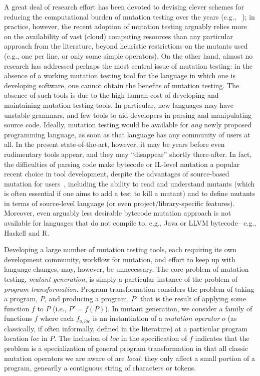 \documentclass[acmsmall,screen,review,anonymous]{acmart}
\begin{document}
A great deal of research effort has been devoted to devising clever
schemes for reducing the computational burden of mutation testing over
the years (e.g., ~\cite{offutt2001mutation,
  untch1993mutation,KaufmanFAKAJ2022}); in practice, however, the recent adoption of mutation
testing arguably relies more on the availability of vast (cloud) computing
resources than any particular approach from the literature, beyond
heuristic restrictions on the mutants used (e.g., one per line, or
only some simple operators).   On the other hand, almost no
research has addressed perhaps the most central issue of
mutation testing: in the absence of a working mutation testing
tool for the language in which one is developing software, one cannot
obtain the benefits of mutation testing.  The absence of such tools is
due to the high human cost of developing and maintaining mutation
testing tools.  In particular, new languages may have unstable
grammars, and few tools to aid developers in parsing and manipulating
source code.   Ideally, mutation testing would be available for
\emph{any} newly proposed programming language, as soon as that
language has any community of users at all.  In the present
state-of-the-art, however, it may be years before even rudimentary
tools appear, and they may ``disappear'' shortly there-after.  In
fact, the difficulties of parsing code make bytecode or IL-level
mutation a popular recent choice in tool development, despite the advantages of source-based mutation for
users~\cite{CompareSrcBinary}, including the
ability to read and understand mutants (which is often essential if
one aims to add a test to kill a mutant) and to define mutants in
terms of source-level language (or even project/library-specific
features).  Moreover, even arguably less desirable bytecode mutation
approach is not available for languages that do not compile to, e.g.,
Java or LLVM bytecode-- e.g., Haskell and R.

Developing a large number of mutation
testing tools, each requiring its own development community, workflow
for mutation, and effort to keep up with language changes, may, however, be
unnecessary.  The core problem of mutation testing,
\emph{mutant generation}, is simply a particular instance of the
problem of \emph{program transformation}.  Program transformation
considers the problem of taking a program, $P$, and producing a
program, $P'$ that is the result of applying some function $f$ to $P$
(i.e., $P' = f(P)$).  In mutant generation, we
consider a family of functions $f$ where each $f_{o,loc}$ is an
instantiation of a \emph{mutation operator} $o$  (as classically, if
often informally, defined in the literature) at a particular program
location $loc$ in $P$.  The inclusion of $loc$ in the specification of
$f$ indicates that the problem is a specialization of general
program transformation in that all classic mutation operators we are
aware of are \emph{local}: they only affect a small portion of a
program, genearlly a contiguous string of characters or tokens.
\end{document}
